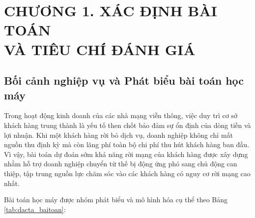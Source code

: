 \documentclass[a4paper]{article}
\begin{document}
\section[CHƯƠNG 1. XÁC ĐỊNH BÀI TOÁN VÀ TIÊU CHÍ ĐÁNH GIÁ]{CHƯƠNG 1. XÁC ĐỊNH BÀI TOÁN\\VÀ TIÊU CHÍ ĐÁNH GIÁ}

\subsection{Bối cảnh nghiệp vụ và Phát biểu bài toán học máy}
Trong hoạt động kinh doanh của các nhà mạng viễn thông, việc duy trì cơ sở khách hàng trung thành là yếu tố then chốt bảo đảm sự ổn định của dòng tiền và lợi nhuận. Khi một khách hàng rời bỏ dịch vụ, doanh nghiệp không chỉ mất nguồn thu định kỳ mà còn lãng phí toàn bộ chi phí thu hút khách hàng ban đầu. Vì vậy, bài toán dự đoán sớm khả năng rời mạng của khách hàng được xây dựng nhằm hỗ trợ doanh nghiệp chuyển từ thế bị động ứng phó sang chủ động can thiệp, tập trung nguồn lực chăm sóc vào các khách hàng có nguy cơ rời mạng cao nhất.

Bài toán học máy được nhóm phát biểu và mô hình hóa cụ thể theo Bảng \ref{tab:dacta_baitoan}:
\end{document}
